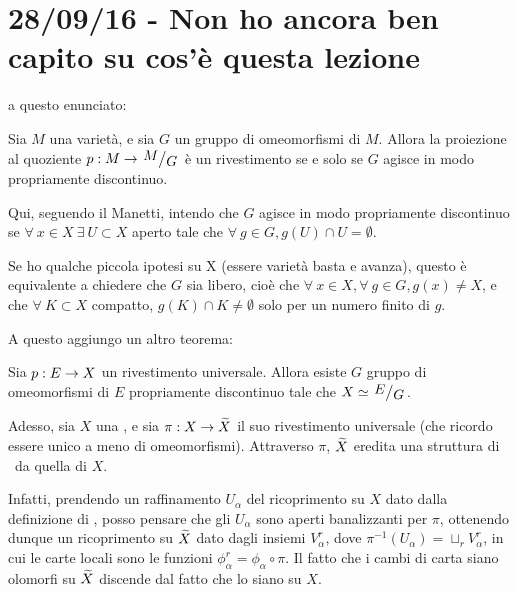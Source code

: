 \chapter{28/09/16 - Non ho ancora ben capito su cos'è questa lezione}
\justify

 a questo enunciato:
\begin{teorema}
	Sia $M$ una varietà, e sia $G$ un gruppo di omeomorfismi di $M$.
 	Allora la proiezione al quoziente $p:M\rar \quotient{M}{G}$ è un rivestimento se e solo se $G$ agisce in modo propriamente discontinuo.
\end{teorema}

Qui, seguendo il Manetti, intendo che $G$ agisce in modo propriamente discontinuo se $\forall\ x\in X\ \exists\ U\subset X$ aperto tale che $\forall\ g\in G, g(U)\cap U=\emptyset$. 

Se ho qualche piccola ipotesi su X (essere varietà basta e avanza), questo è equivalente a chiedere che $G$ sia libero, cioè che $\forall\ x \in X, \forall\ g\in G, g(x)\neq X$, e che $\forall\ K \subset X$ compatto, $g(K)\cap K \neq \emptyset$ solo per un numero finito di $g$.

A questo aggiungo un altro teorema:

\begin{teorema} \label{rivuniv}
 	Sia $p:E\rightarrow X$ un rivestimento universale. Allora esiste $G$ gruppo di omeomorfismi di $E$ propriamente discontinuo tale che $X\isom\quotient{E}{G}$.
\end{teorema}

Adesso, sia $X$ una \sdR, e sia $\pi:X\rightarrow\widetilde{X}$ il suo rivestimento universale (che ricordo essere unico a meno di omeomorfismi). Attraverso $\pi$, $\widetilde{X}$ eredita una struttura di \sdR\ da quella di $X$.

Infatti, prendendo un raffinamento $U_\alpha$ del ricoprimento su $X$ dato dalla definizione di \sdR, posso pensare che gli $U_\alpha$ sono aperti banalizzanti per $\pi$, ottenendo dunque un ricoprimento su $\widetilde{X}$ dato dagli insiemi $V_\alpha^r$, dove $\pi^{-1}(U_\alpha)=\sqcup_r V_\alpha^r$, in cui le carte locali sono le funzioni $\phi_\alpha^r=\phi_\alpha\circ\pi$. Il fatto che i cambi di carta siano olomorfi su $\widetilde{X}$ discende dal fatto che lo siano su $X$.

